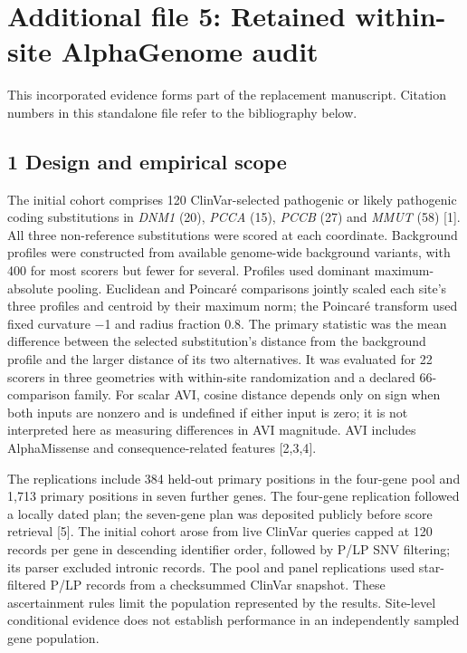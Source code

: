 \documentclass[
  11pt,
]{article}
\author{}
\date{}
\begin{document}
\section{Additional file 5: Retained within-site AlphaGenome
audit}\label{additional-file-5-retained-within-site-alphagenome-audit}

This incorporated evidence forms part of the replacement manuscript.
Citation numbers in this standalone file refer to the bibliography
below.

\subsection{1 Design and empirical
scope}\label{design-and-empirical-scope}

The initial cohort comprises 120 ClinVar-selected pathogenic or likely
pathogenic coding substitutions in \emph{DNM1} (20), \emph{PCCA} (15),
\emph{PCCB} (27) and \emph{MMUT} (58) {[}1{]}. All three non-reference
substitutions were scored at each coordinate. Background profiles were
constructed from available genome-wide background variants, with 400 for
most scorers but fewer for several. Profiles used dominant
maximum-absolute pooling. Euclidean and Poincaré comparisons jointly
scaled each site's three profiles and centroid by their maximum norm;
the Poincaré transform used fixed curvature −1 and radius fraction 0.8.
The primary statistic was the mean difference between the selected
substitution's distance from the background profile and the larger
distance of its two alternatives. It was evaluated for 22 scorers in
three geometries with within-site randomization and a declared
66-comparison family. For scalar AVI, cosine distance depends only on
sign when both inputs are nonzero and is undefined if either input is
zero; it is not interpreted here as measuring differences in AVI
magnitude. AVI includes AlphaMissense and consequence-related features
{[}2,3,4{]}.

The replications include 384 held-out primary positions in the four-gene
pool and 1,713 primary positions in seven further genes. The four-gene
replication followed a locally dated plan; the seven-gene plan was
deposited publicly before score retrieval {[}5{]}. The initial cohort
arose from live ClinVar queries capped at 120 records per gene in
descending identifier order, followed by P/LP SNV filtering; its parser
excluded intronic records. The pool and panel replications used
star-filtered P/LP records from a checksummed ClinVar snapshot. These
ascertainment rules limit the population represented by the results.
Site-level conditional evidence does not establish performance in an
independently sampled gene population.
\end{document}
